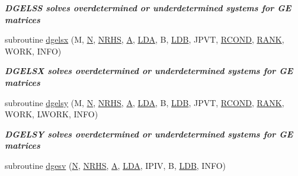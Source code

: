 \begin{DoxyCompactItemize}
\begin{DoxyCompactList}\small\item\em {\bfseries  D\+G\+E\+L\+S\+S solves overdetermined or underdetermined systems for G\+E matrices} \end{DoxyCompactList}\item 
subroutine \hyperlink{group__doubleGEsolve_ga6252143bd7183eb34700395cbe013ff6}{dgelsx} (M, \hyperlink{polmisc_8c_a0240ac851181b84ac374872dc5434ee4}{N}, \hyperlink{example__user_8c_aa0138da002ce2a90360df2f521eb3198}{N\+R\+H\+S}, \hyperlink{classA}{A}, \hyperlink{example__user_8c_ae946da542ce0db94dced19b2ecefd1aa}{L\+D\+A}, B, \hyperlink{example__user_8c_a50e90a7104df172b5a89a06c47fcca04}{L\+D\+B}, J\+P\+V\+T, \hyperlink{superlu__enum__consts_8h_af00a42ecad444bbda75cde1b64bd7e72a9b5c151728d8512307565994c89919d5}{R\+C\+O\+N\+D}, \hyperlink{splinemodule_8c_a3a88bcc63386de30443dacede2e01847}{R\+A\+N\+K}, W\+O\+R\+K, I\+N\+F\+O)
\begin{DoxyCompactList}\small\item\em {\bfseries  D\+G\+E\+L\+S\+X solves overdetermined or underdetermined systems for G\+E matrices} \end{DoxyCompactList}\item 
subroutine \hyperlink{group__doubleGEsolve_ga385713b8bcdf85663ff9a45926fac423}{dgelsy} (M, \hyperlink{polmisc_8c_a0240ac851181b84ac374872dc5434ee4}{N}, \hyperlink{example__user_8c_aa0138da002ce2a90360df2f521eb3198}{N\+R\+H\+S}, \hyperlink{classA}{A}, \hyperlink{example__user_8c_ae946da542ce0db94dced19b2ecefd1aa}{L\+D\+A}, B, \hyperlink{example__user_8c_a50e90a7104df172b5a89a06c47fcca04}{L\+D\+B}, J\+P\+V\+T, \hyperlink{superlu__enum__consts_8h_af00a42ecad444bbda75cde1b64bd7e72a9b5c151728d8512307565994c89919d5}{R\+C\+O\+N\+D}, \hyperlink{splinemodule_8c_a3a88bcc63386de30443dacede2e01847}{R\+A\+N\+K}, W\+O\+R\+K, L\+W\+O\+R\+K, I\+N\+F\+O)
\begin{DoxyCompactList}\small\item\em {\bfseries  D\+G\+E\+L\+S\+Y solves overdetermined or underdetermined systems for G\+E matrices} \end{DoxyCompactList}\item 
subroutine \hyperlink{group__doubleGEsolve_ga5ee879032a8365897c3ba91e3dc8d512}{dgesv} (\hyperlink{polmisc_8c_a0240ac851181b84ac374872dc5434ee4}{N}, \hyperlink{example__user_8c_aa0138da002ce2a90360df2f521eb3198}{N\+R\+H\+S}, \hyperlink{classA}{A}, \hyperlink{example__user_8c_ae946da542ce0db94dced19b2ecefd1aa}{L\+D\+A}, I\+P\+I\+V, B, \hyperlink{example__user_8c_a50e90a7104df172b5a89a06c47fcca04}{L\+D\+B}, I\+N\+F\+O)

\end{DoxyCompactItemize}
